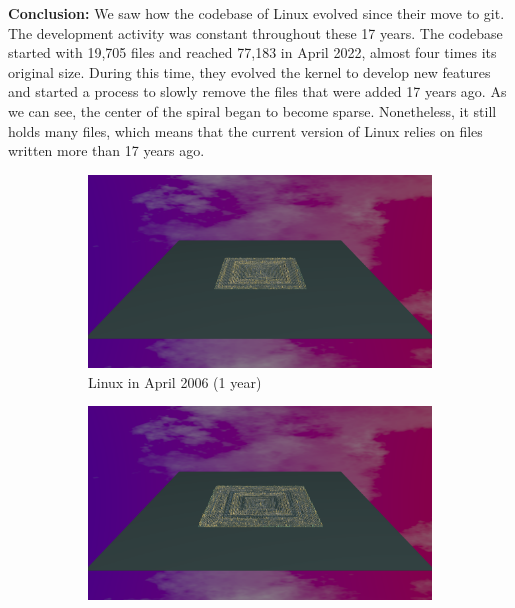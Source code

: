 \bigbreak
\noindent
\textbf{Conclusion:}
 We saw how the codebase of Linux evolved since their move to git. The development activity was constant throughout these 17 years. The codebase started with 19,705 files and reached 77,183 in April 2022, almost four times its original size. During this time, they evolved the kernel to develop new features and started a process to slowly remove the files that were added 17 years ago. As we can see, the center of the spiral began to become sparse. Nonetheless, it still holds many files, which means that the current version of Linux relies on files written more than 17 years ago. 


\begin{figure}[ht]
    \begin{subfigure}{0.48\textwidth}
        \includegraphics[width=\linewidth]{Linux/Animation001.png}
        \caption{Linux in April 2006 (1 year)} 
        \label{fig:Linux_V7_S1}
    \end{subfigure}\hspace*{\fill}
    \begin{subfigure}{0.48\textwidth}
        \includegraphics[width=\linewidth]{Linux/Animation004.png}

\end{subfigure}
\end{figure}
